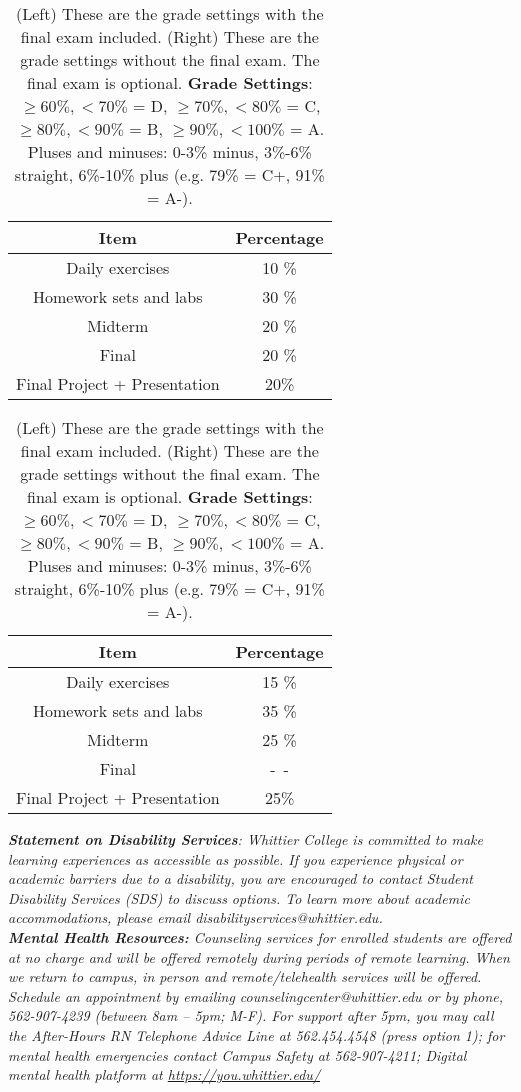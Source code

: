 \documentclass[10pt]{article}
\begin{document}
\begin{table}[h]
\centering
\begin{tabular}{| c | c |}
\hline
Item & Percentage \\ \hline \hline
Daily exercises & 10 \% \\ \hline
Homework sets and labs & 30 \% \\ \hline
Midterm & 20 \% \\ \hline
Final & 20 \% \\ \hline
Final Project + Presentation & 20\% \\ \hline
\end{tabular}
\begin{tabular}{| c | c |}
\hline
Item & Percentage \\ \hline \hline
Daily exercises & 15 \% \\ \hline
Homework sets and labs & 35 \% \\ \hline
Midterm & 25 \% \\ \hline
Final & -~- \\ \hline
Final Project + Presentation & 25\% \\ \hline
\end{tabular}
\caption{\label{tab:grades} (Left) These are the grade settings with the final exam included. (Right) These are the grade settings without the final exam.  The final exam is optional. \textbf{Grade Settings}: $\geq 60\%, <70\%$ = D, $\geq 70\%, <80\%$ = C, $\geq 80\%, <90\%$ = B, $\geq 90\%, <100\%$ = A. Pluses and minuses: 0-3\% minus, 3\%-6\% straight, 6\%-10\% plus (e.g. 79\% = C+, 91\% = A-).}
\end{table}
\clearpage
\noindent
\textit{\textbf{Statement on Disability Services}: Whittier College is committed to make learning experiences as accessible as possible. If you experience physical or academic barriers due to a disability, you are encouraged to contact Student Disability Services (SDS) to discuss options. To learn more about academic accommodations, please email disabilityservices@whittier.edu.} \\
\textit{\textbf{Mental Health Resources:} Counseling services for enrolled students are offered at no charge and will be offered remotely during periods of remote learning. When we return to campus, in person and remote/telehealth services will be offered. Schedule an appointment by emailing counselingcenter@whittier.edu  or by phone, 562-907-4239 (between 8am – 5pm; M-F). For support after 5pm, you may call the After-Hours RN Telephone Advice Line at 562.454.4548 (press option 1); for mental health emergencies contact Campus Safety at 562-907-4211; Digital mental health platform at \url{https://you.whittier.edu/}} \\ \\
\end{document}
